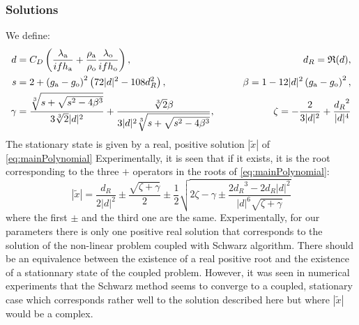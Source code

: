 \subsubsection{Solutions}
\label{sec:summary_stationnary}
We define:
\begin{equation}
    \begin{aligned}
    {d} &= C_D\left(
    \frac{\lambda_{\rm a}}{if h_{\rm a}} 
    +\frac{\rho_{\rm a}}{\rho_{\rm o}}\frac{\lambda_{\rm o}}{if h_{\rm o}} \right), \qquad &d_R = \mathfrak{R}(d),
    \\
    s &= 2 + \left(g_{\rm a} - g_{\rm o}\right)^2 \left(72 |d|^2 - 108 d_R^2 \right),
    \qquad
    &\beta = 1 - 12 |d|^2 \left(g_{\rm a} - g_{\rm o}\right)^2, \\
    \gamma &= \frac{\sqrt[3]{s+\sqrt{s^2 - 4 \beta^3}}}{3\sqrt[3]{2}|d|^2} +\frac{\sqrt[3]{2}\beta}{3|d|^2 \sqrt[3]{s+\sqrt{s^2 - 4 \beta^3}}}, 
    \qquad &\zeta = -\frac{2}{3|d|^2} + \frac{{d_R}^2}{|d|^4}
    \end{aligned}
\end{equation}
The stationary state is given by a real, positive solution $|\widetilde{x}|$ of \eqref{eq:mainPolynomial}
Experimentally, it is seen that if it exists, it is the root corresponding to the three $+$ operators in the roots of \eqref{eq:mainPolynomial}:
\begin{equation}
    |\widetilde{x}| = \frac{{d_R}}{2|d|^2} \pm \frac{\sqrt{\zeta + \gamma }}{2} \pm \frac{1}{2}
    \sqrt{
    2\zeta - 
    \gamma
    \pm
    \frac{2{d_R}^3 - 2{d_R}|d|^2}{|d|^6 \sqrt{\zeta + \gamma }}
    }
\end{equation}
where the first $\pm$ and the
third one are the same. Experimentally, for our parameters there is only one positive real solution that corresponds to the solution of the non-linear problem coupled with Schwarz algorithm. There should be an equivalence between the existence of a real positive root and the existence of a stationnary state of the coupled problem.
{\color{red} However, it was seen in numerical experiments that the Schwarz method 
seems to converge to a coupled, stationary case which corresponds
rather well to the solution described here but where $|\widetilde{x}|$ would be a complex.}

